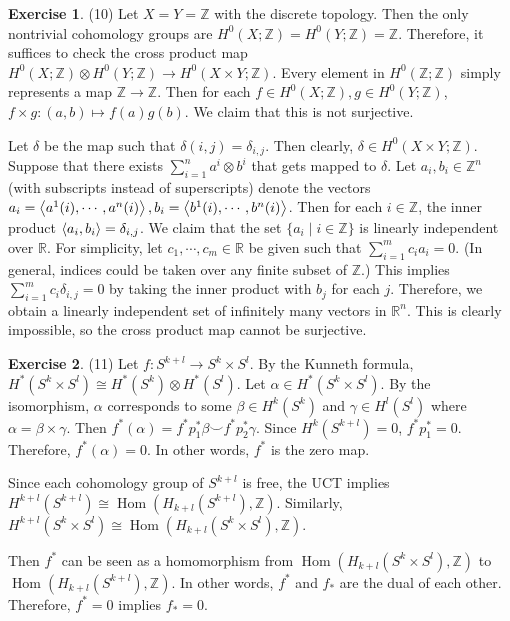 \documentclass[12pt, psamsfonts]{amsart}
\theoremstyle{definition}
\newtheorem*{exer}{Exercise}
\theoremstyle{remark}
\DeclareMathOperator{\Hom}{Hom}
\numberwithin{equation}{section}
\begin{document}
\begin{exer}{(10)}
  Let $X = Y = \mathbb{Z}$ with the discrete topology.
  Then the only nontrivial cohomology groups are $H^0(X; \mathbb{Z}) = H^0(Y; \mathbb{Z}) = \mathbb{Z}$.
  Therefore, it suffices to check the cross product map $H^0(X; \mathbb{Z}) \otimes H^0(Y; \mathbb{Z}) \rightarrow H^0(X \times Y; \mathbb{Z})$.
  Every element in $H^0(\mathbb{Z}; \mathbb{Z})$ simply represents a map $\mathbb{Z} \rightarrow \mathbb{Z}$.
  Then for each $f \in H^0(X; \mathbb{Z}), g \in H^0(Y; \mathbb{Z})$, $f \times g: (a, b) \mapsto f(a)g(b)$.
  We claim that this is not surjective.

  Let $\delta$ be the map such that $\delta(i, j) = \delta_{i, j}$.
  Then clearly, $\delta \in H^0(X \times Y; \mathbb{Z})$.
  Suppose that there exists $\sum_{i=1}^{n} a^i \otimes b^i$ that gets mapped to $\delta$.
  Let $a_i, b_i \in \mathbb{Z}^n$ (with subscripts instead of superscripts) denote the vectors $a_i = \ev{a^1(i), \cdots, a^n(i)}, b_i = \ev{b^1(i), \cdots, b^n(i)}$.
  Then for each $i \in \mathbb{Z}$, the inner product $\ev{a_i, b_i} = \delta_{i, j}$.
  We claim that the set $\{ a_i \mid i \in \mathbb{Z} \}$ is linearly independent over $\mathbb{R}$.
  For simplicity, let $c_1, \cdots, c_m \in \mathbb{R}$ be given such that $\sum_{i=1}^{m} c_ia_i = 0$.
  (In general, indices could be taken over any finite subset of $\mathbb{Z}$.)
  This implies $\sum_{i=1}^{m} c_i\delta_{i, j} = 0$ by taking the inner product with $b_j$ for each $j$.
  Therefore, we obtain a linearly independent set of infinitely many vectors in $\mathbb{R}^n$.
  This is clearly impossible, so the cross product map cannot be surjective.
\end{exer}

\begin{exer}{(11)}
  Let $f: S^{k + l} \rightarrow S^k \times S^l$.
  By the Kunneth formula, $H^{\ast}(S^k \times S^l) \cong H^{\ast}(S^k) \otimes H^{\ast}(S^l)$.
  Let $\alpha \in H^{\ast}(S^k \times S^l)$.
  By the isomorphism, $\alpha$ corresponds to some $\beta \in H^k(S^k)$ and $\gamma \in H^l(S^l)$ where $\alpha = \beta \times \gamma$.
  Then $f^{\ast}(\alpha) = f^{\ast}p_1^{\ast}\beta \smile f^{\ast}p_2^{\ast}\gamma$.
  Since $H^k(S^{k + l}) = 0$, $f^{\ast}p_1^{\ast} = 0$.
  Therefore, $f^{\ast}(\alpha) = 0$.
  In other words, $f^{\ast}$ is the zero map.

  Since each cohomology group of $S^{k + l}$ is free, the UCT implies $H^{k + l}(S^{k + l}) \cong \Hom(H_{k + l}(S^{k + l}), \mathbb{Z})$.
  Similarly, $H^{k + l}(S^k \times S^l) \cong \Hom(H_{k + l}(S^k \times S^l), \mathbb{Z})$.

  Then $f^{\ast}$ can be seen as a homomorphism from $\Hom(H_{k + l}(S^k \times S^l), \mathbb{Z})$ to $\Hom(H_{k + l}(S^{k + l}), \mathbb{Z})$.
  In other words, $f^{\ast}$ and $f_{\ast}$ are the dual of each other.
  Therefore, $f^{\ast} = 0$ implies $f_{\ast} = 0$.
\end{exer}
\end{document}
